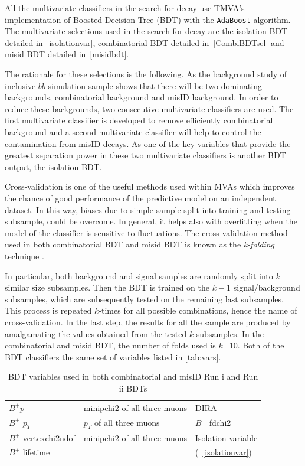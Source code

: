 All the multivariate classifiers in the search for \Bmumumu decay use TMVA's \cite{Speckmayer:2010zz} implementation of Boosted Decision Tree (BDT) with the \texttt{AdaBoost} algorithm. The multivariate selections used in the search for \Bmumumu decay are the isolation BDT detailed in~\autoref{isolationvar}, combinatorial BDT detailed in~\autoref{CombiBDTsel} and misid BDT detailed in~\autoref{misidbdt}.

The rationale for these selections is the following. As the background study of inclusive $b\bar{b}$ simulation sample shows that there will be two dominating backgrounds, combinatorial background and misID background. In order to reduce these backgrounds, two consecutive multivariate classifiers are used. The first multivariate classifier is developed to remove efficiently combinatorial background and a second multivariate classifier will help to control the contamination from misID decays. As one of the key variables that provide the greatest separation power in these two multivariate classifiers is another BDT output, the isolation BDT.

Cross-validation is one of the useful methods used within MVAs which improves the chance of good performance of the predictive model on an independent dataset. In this way, biases due to simple sample split into training and testing subsample, could be overcome. In general, it helps also with overfitting when the model of the classifier is sensitive to fluctuations.  The cross-validation method used in both combinatorial BDT and misid BDT is known as the \textit{k-folding} technique \cite{kfold}. 

In particular, both background and signal samples are randomly split into $k$ similar size subsamples. Then the BDT is trained on the $k-1$ signal/background subsamples, which are subsequently tested on the remaining last subsamples. This process is repeated $k$-times for all possible combinations, hence the name of cross-validation. In the last step, the results for all the sample are produced by amalgamating the values obtained from the tested $k$ subsamples. In the combinatorial and misid BDT, the number of folds used is $k$=10. Both of the BDT classifiers the same set of variables listed in \autoref{tab:vars}.

\begin{table}[h!]
\begin{center}
\begin{tabular}{| l  l  l |} \hline
$B^{+} p$ & \gls{minipchi2} of all three muons & \gls{DIRA} \\
$B^{+}$ $p_T$ & $p_{T}$ of all three muons & $B^{+}$ \gls{fdchi2} \\ 
$B^{+}$ \gls{vertexchi2ndof} & \gls{minipchi2} of all three muons  & Isolation variable \\
	$B^{+}$ lifetime &  & (~\autoref{isolationvar}) \\ \hline
\end{tabular}
\end{center}
\caption{BDT variables used in both combinatorial and misID Run \Rn{1} and Run \Rn{2} BDTs}
\label{tab:vars}
\end{table}



